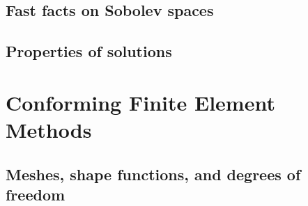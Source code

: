\documentclass[american,ignorenonframetext,notheorems,aspectratio=1610]{beamer}
\begin{document}
\subsection{Fast facts on Sobolev spaces}
\frame{\tableofcontents[currentsection,subsectionstyle=show/shaded/hide]}

\frame {}
\frame {}
\frame {
  }
\frame {
  }

\frame {}
\frame {}
\frame {}
\frame {
  }
\frame {}
\frame {
  }

\subsection{Properties of solutions}
\frame{\tableofcontents[currentsection,subsectionstyle=show/shaded/hide]}

\frame {
  
  
  }
\frame {
  
  
  }
\frame {}

\section{Conforming Finite Element Methods}
\frame{\sectoc}
\subsection{Meshes, shape functions, and degrees of freedom}
\frame {
  }
\frame {
}
\frame {
  }
\frame {}
\frame {}
\frame {}
\frame {
  }
\end{document}
